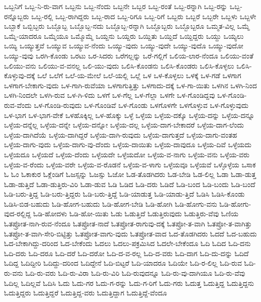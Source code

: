 {ಒಬ್ಬನಿಗೆ
ಒಬ್ಬ-ನಿ-ರು-ವಾಗ
ಒಬ್ಬನು
ಒಬ್ಬ-ನೆಂದು
ಒಬ್ಬನೇ
ಒಬ್ಬರ
ಒಬ್ಬ-ರಂತೆ
ಒಬ್ಬ-ರನ್ನಾಗಿ
ಒಬ್ಬ-ರನ್ನು
ಒಬ್ಬ-ರನ್ನೊಬ್ಬರು
ಒಬ್ಬ-ರಲ್ಲಿ
ಒಬ್ಬ-ರಾಗಿದ್ದರು
ಒಬ್ಬ-ರಾದ
ಒಬ್ಬ-ರಿಗೂ
ಒಬ್ಬ-ರಿಗೆ
ಒಬ್ಬರು
ಒಬ್ಬರೆ
ಒಬ್ಬರೇ
ಒಬ್ಬಳು
ಒಬ್ಬಳೇ
ಒಬ್ಬಾಕೆ
ಒಬ್ಬಿಬ್ಬರು
ಒಬ್ಬೊಬ್ಬ
ಒಬ್ಬೊಬ್ಬ-ನದು
ಒಬ್ಬೊಬ್ಬ-ರನ್ನಾಗಿ
ಒಬ್ಬೊಬ್ಬರು
ಒಬ್ಬೊಬ್ಬರೂ
ಒಮ್ಮತ-ವಿಲ್ಲ
ಒಮ್ಮೆ
ಒಮ್ಮೆ-ಯಾದರೂ
ಒಮ್ಮೆಯೂ
ಒಮ್ಮೊಮ್ಮೆ
ಒಯ್ದನು
ಒಯ್ದರು
ಒಯ್ದಿತು
ಒಯ್ದಿದೆ
ಒಯ್ದಿದ್ದರು
ಒಯ್ದು
ಒಯ್ಯಲು
ಒಯ್ಯಿ
ಒಯ್ಯುತ್ತವೆ
ಒಯ್ಯುವ
ಒಯ್ಯುವ-ನೆಂದು
ಒಯ್ಯು-ವುದು
ಒಯ್ಯು-ವುದೇ
ಒಯ್ಯು-ವುದೊ
ಒಯ್ಯು-ವುದೋ
ಒಯ್ಯು-ವುವು
ಒರಗಿ-ಕೊಂಡು
ಒರಟು
ಒರ-ಸಿದರು
ಒರೆಗಲ್ಲನ್ನು
ಒರೆ-ಗಲ್ಲಿಗೆ
ಒಲಿಯ-ಲಾರ-ನೆಂದೂ
ಒಲಿಯು-ವಂತೆ
ಒಲಿಯು-ವನು
ಒಲಿಯು-ವ-ವನಲ್ಲ
ಒಲಿ-ಯು-ವುದು
ಒಲಿಸಿ-ಕೊಂಡನು
ಒಲಿಸಿ-ಕೊಂಡರು
ಒಲಿಸಿ-ಕೊಳ್ಳಲು
ಒಲಿಸಿ-ಕೊಳ್ಳುವು-ದಕ್ಕೆ
ಒಲೆ
ಒಲೆಗೆ
ಒಲೆ-ಯ-ಮೇಲೆ
ಒಲೆ-ಯಲ್ಲಿ
ಒಲ್ಲೆ
ಒಳ
ಒಳ-ಕೊಳ್ಳಲು
ಒಳಕ್ಕೆ
ಒಳ-ಗಡೆ
ಒಳಗಾಗ
ಒಳಗಾಗ-ಬೇಕಾಗು-ವುದು
ಒಳ-ಗಾಗಿ-ರುವೆಯಾ
ಒಳಗಾಗುತ್ತಿತ್ತು
ಒಳಗಾದು-ದಕ್ಕೆ
ಒಳ-ಗಾ-ಯಿತು
ಒಳಗಿನ
ಒಳಗಿ-ನಿಂದ
ಒಳಗಿ-ನಿಂದಲೇ
ಒಳಗಿ-ರುವ
ಒಳ-ಗಿ-ಳಿದು
ಒಳಗೆ
ಒಳ-ಗೆಲ್ಲ
ಒಳ-ಗೆಲ್ಲಾ
ಒಳಗೇ
ಒಳ-ಗೊಂಡಿದ್ದವು
ಒಳ-ಗೊಂಡಿ-ರುವ-ವೆಂದು
ಒಳ-ಗೊಂಡಿ-ರುವುದು
ಒಳ-ಗೊಂಡಿವೆ
ಒಳ-ಗೊಂಡು
ಒಳಗೊಳಗೇ
ಒಳಗೊಳ್ಳುವ
ಒಳ-ಗೊಳ್ಳುವುದು
ಒಳ-ಭಾಗ
ಒಳ-ಭಾಗ-ವೇಕೆ
ಒಳಹೊಕ್ಕಿಲ್ಲ
ಒಳ-ಹೊಕ್ಕು
ಒಳ್ಳೆ
ಒಳ್ಳೆಯ
ಒಳ್ಳೆಯ-ದಕ್ಕೊ
ಒಳ್ಳೆಯ-ದನ್ನು
ಒಳ್ಳೆಯ-ದನ್ನೂ
ಒಳ್ಳೆಯ-ದನ್ನೆಲ್ಲ
ಒಳ್ಳೆಯ-ದನ್ನೇ
ಒಳ್ಳೆಯ-ದನ್ನೋ
ಒಳ್ಳೆಯ-ದಲ್ಲ
ಒಳ್ಳೆಯ-ದಾಗ-ಬೇಕಾದರೆ
ಒಳ್ಳೆಯ-ದಾಗ-ಲೆಂದು
ಒಳ್ಳೆಯ-ದಾಗಿದೆಯೆ
ಒಳ್ಳೆಯ-ದಾಗಿದ್ದರೆ
ಒಳ್ಳೆಯ-ದಾಗಿ-ರುವುದು
ಒಳ್ಳೆಯ-ದಾಗುತ್ತದೆ
ಒಳ್ಳೆಯ-ದಾಗು-ವಂತಹ
ಒಳ್ಳೆಯ-ದಾಗು-ವುದು
ಒಳ್ಳೆಯ-ದಾಗು-ವು-ದೆಂದು
ಒಳ್ಳೆಯ-ದಾಯಿತು
ಒಳ್ಳೆಯ-ದಾವುದೂ
ಒಳ್ಳೆಯ-ದಿವೆ
ಒಳ್ಳೆಯದು
ಒಳ್ಳೆಯದೂ
ಒಳ್ಳೆಯದೆ
ಒಳ್ಳೆಯ-ದೆಂದು
ಒಳ್ಳೆಯದೇ
ಒಳ್ಳೆಯದೋ
ಒಳ್ಳೆಯ-ವ-ನಾಗು
ಒಳ್ಳೆಯ-ವನು
ಒಳ್ಳೆಯ-ವರು
ಒಳ್ಳೆಯ-ವ-ರೆಂದು
ಒಳ್ಳೆಯ-ವರೇ
ಒಳ್ಳೆಯ-ವ-ರೊಡನೆ
ಒಳ್ಳೆಯ-ವ-ಳಾಗು
ಒಳ್ಳೆಯವೂ
ಒಳ್ಳೆಯವೆ
ಒಳ್ಳೊಳ್ಳೆಯ
ಒಸಾಕ
ಓ
ಓಂ
ಓಕಾಕುರ
ಓಕ್ಲೆಂಡಿಗೆ
ಓಜಸ್ಸನ್ನು
ಓಜಸ್ಸು
ಓಜೋ
ಓಡ-ತೊಡಗಿದರು
ಓಡ-ಬೇಡಿ
ಓಡ-ಲಿಲ್ಲ
ಓಡಾ
ಓಡಾ-ಡುತ್ತ
ಓಡಾ-ಡುತ್ತಿದೆ
ಓಡಾ-ಡುತ್ತಿರು-ವಿರಿ
ಓಡಾ-ಡುವ
ಓಡಿ
ಓಡಿದ
ಓಡಿ-ದರು
ಓಡಿದೆ
ಓಡಿ-ಬಂದ
ಓಡಿ-ಬಂದು
ಓಡಿ-ಬಂದೆ
ಓಡಿ-ಬರು-ತ್ತಿದ್ದ
ಓಡಿ-ಬರು-ತ್ತಿದ್ದರು
ಓಡಿ-ಬರು-ತ್ತಿದ್ದೆ
ಓಡಿ-ಯಾಡುತ್ತ
ಓಡಿ-ಯಾಡು-ತ್ತಿದೆ
ಓಡಿಸಿ
ಓಡಿಸಿ-ಕೊಂಡು
ಓಡಿಸಿ-ಬಿಡ-ಬಹುದು
ಓಡಿ-ಹೋಗ-ಬಹುದು
ಓಡಿ-ಹೋಗ-ಬೇಡಿ
ಓಡಿ-ಹೋಗಿ
ಓಡಿ-ಹೋಗು-ವನು
ಓಡಿ-ಹೋಗು-ವುದ-ರಲ್ಲಿದ್ದ
ಓಡಿ-ಹೋದಳು
ಓಡಿ-ಹೋ-ಯಿತು
ಓಡು
ಓಡುತ್ತಿದೆ
ಓಡುತ್ತಿರುವುದು
ಓಡುತ್ತಿರು-ವೆವು
ಓಣಿಯ
ಓತಪ್ರೋತ-ನಾಗಿ-ರುವ-ನೆಂದೂ
ಓತಪ್ರೋತ-ನಾದೆ
ಓತಪ್ರೋತ-ರಾಗುವು-ದಕ್ಕೆ
ಓತಪ್ರೋ-ತ-ವಾಗಿ
ಓತಪ್ರೋ-ತ-ವಾಗಿತ್ತು
ಓತಪ್ರೋ-ತ-ವಾಗಿ-ಸೇರಿ-ಬಿಟ್ಟಿತ್ತು
ಓತಪ್ರೋತ-ವಾಗು-ವುದು
ಓತಪ್ರೋತ-ವಾದ
ಓದ-ತೊಡಗಿದರು
ಓದದೆ
ಓದ-ಬಹುದು
ಓದ-ಬೇಕಾಗಿದ್ದು-ದರಿಂದ
ಓದ-ಬೇಕೆಂದು
ಓದಲು
ಓದಲು-ಪಕ್ರಮಿಸಿದ
ಓದಲೇ-ಬೇಕೆಂದೂ
ಓದಿ
ಓದಿದ
ಓದಿ-ದನು
ಓದಿ-ದರು
ಓದಿ-ದರೂ
ಓದಿ-ದರೆ
ಓದಿ-ದರೋ
ಓದಿ-ದ-ವ-ರಲ್ಲ
ಓದಿ-ದ-ವರು
ಓದಿ-ದಾಗ
ಓದಿ-ದು-ದನ್ನು
ಓದಿದೆ
ಓದಿದ್ದ
ಓದಿದ್ದೀರಿ
ಓದಿದ್ದು-ದರಿಂದ
ಓದಿದ್ದೇನೆ
ಓದಿ-ಬಿಟ್ಟರೆ
ಓದಿ-ಯಾದರೂ
ಓದಿಯೇ
ಓದಿ-ರ-ಲಿಲ್ಲ
ಓದಿ-ರುವ
ಓದಿ-ರು-ವನು
ಓದಿ-ರು-ವರು
ಓದಿ-ರು-ವಿರಾ
ಓದಿ-ರು-ವಿರಿ
ಓದಿ-ರುವುದನ್ನೂ
ಓದಿ-ರು-ವು-ದಾಗಿಯೂ
ಓದಿ-ರು-ವೆವು
ಓದಿಲ್ಲ
ಓದಿಲ್ಲವೆ
ಓದಿಸಿ
ಓದು
ಓದು-ಗರ
ಓದು-ಗ-ರನ್ನು
ಓದು-ಗ-ರಿಗೆ
ಓದು-ಗರು
ಓದುತ್ತ
ಓದುತ್ತಿದ್ದ
ಓದುತ್ತಿದ್ದನು
ಓದುತ್ತಿದ್ದರು
ಓದುತ್ತಿದ್ದರೆ
ಓದುತ್ತಿದ್ದ-ವರು
ಓದುತ್ತಿದ್ದಾಗ
ಓದುತ್ತಿದ್ದೆ-ವೆಂದೂ
}

